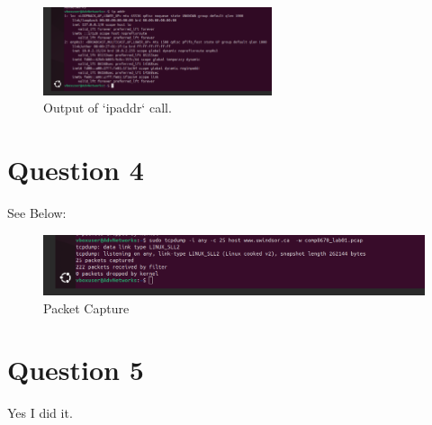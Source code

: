 \documentclass{article}
\begin{document}
\begin{figure}[h]
    \centering
    \includegraphics[width=0.6\textwidth]{./screenshots/ipaddr.png}
    \caption{Output of `ipaddr` call.}
    \label{fig:ipaddr}
\end{figure}

\section{Question 4}
See Below:

\begin{figure}[h]
    \centering
    \includegraphics[width=1\textwidth]{./screenshots/tcpdump.png}
    \caption{Packet Capture}
    \label{fig:tcpdump}
\end{figure}

\section{Question 5}
Yes I did it.
\end{document}
